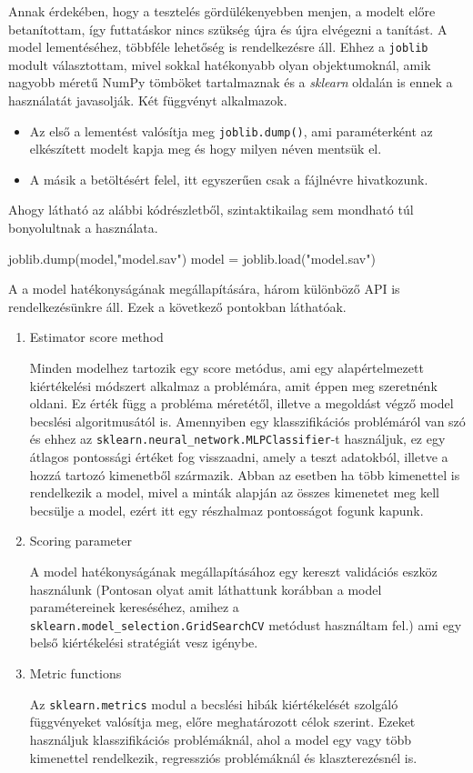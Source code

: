 Annak érdekében, hogy a tesztelés gördülékenyebben menjen, a modelt előre betanítottam, így futtatáskor nincs szükség újra és újra elvégezni a tanítást.
A model lementéséhez, többféle lehetőség is rendelkezésre áll. Ehhez a \texttt{joblib} modult választottam, mivel sokkal hatékonyabb olyan objektumoknál, amik nagyobb méretű NumPy tömböket tartalmaznak és a \textit{sklearn} oldalán is ennek a használatát javasolják.
Két függvényt alkalmazok.
\begin{itemize}
	\item Az első a lementést valósítja meg \texttt{joblib.dump()}, ami paraméterként az elkészített modelt kapja meg és hogy milyen néven mentsük el.
\item A másik a betöltésért felel, itt egyszerűen csak a fájlnévre hivatkozunk.
\end{itemize}
Ahogy látható az alábbi kódrészletből, szintaktikailag sem mondható túl bonyolultnak a használata.

\begin{python}
joblib.dump(model,"model.sav") 
model = joblib.load("model.sav") 
\end{python}

A a model hatékonyságának megállapítására, három különböző API is rendelkezésünkre áll.
Ezek a következő pontokban láthatóak.

\begin{enumerate}
\item Estimator score method

Minden modelhez tartozik egy score metódus, ami egy alapértelmezett kiértékelési módszert alkalmaz a problémára, amit éppen meg szeretnénk oldani. 
Ez érték függ a probléma méretétől, illetve a megoldást végző model becslési algoritmusától is.
Amennyiben egy klasszifikációs problémáról van szó és ehhez az \texttt{sklearn.neural\_network.MLPClassifier}-t használjuk, ez egy átlagos pontossági értéket fog visszaadni, amely a teszt adatokból, illetve a hozzá tartozó kimenetből származik. Abban az esetben ha több kimenettel is rendelkezik a model, mivel a minták alapján az összes kimenetet meg kell becsülje a model, ezért itt egy részhalmaz pontosságot fogunk kapunk.

\item Scoring parameter

A model hatékonyságának megállapításához egy kereszt validációs eszköz használunk (Pontosan olyat amit láthattunk korábban a model paramétereinek kereséséhez, amihez a \texttt{sklearn.model\_selection.GridSearchCV} metódust használtam fel.) ami egy belső kiértékelési stratégiát vesz igénybe.

\item Metric functions

Az \texttt{sklearn.metrics} modul a becslési hibák kiértékelését szolgáló függvényeket valósítja meg, előre meghatározott célok szerint.
Ezeket használjuk klasszifikációs problémáknál, ahol a model egy vagy több kimenettel rendelkezik, regressziós problémáknál és klaszterezésnél is.
\end{enumerate}

